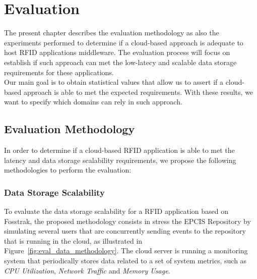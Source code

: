 
\chapter{Evaluation}
\label{chapter:evaluation}
The present chapter describes the evaluation methodology as also the experiments performed to determine
if a cloud-based approach is adequate to host \gls{RFID} applications middleware. The evaluation process
will focus on establish if such approach can met the low-latecy and scalable data storage requirements
for these applications.\\

Our main goal is to obtain statistical values that allow us to assert if a cloud-based approach is able
to met the expected requirements. With these results, we want to specify which domains can rely in such
approach.

\section{Evaluation Methodology}
\label{sec:eval_methodology}
In order to determine if a cloud-based \gls{RFID} application is able to met the latency and data
storage scalability requirements, we propose the following methodologies to perform the evaluation:

\subsection{Data Storage Scalability}
\label{sub:eval_methodology_data}
To evaluate the data storage scalability for a \gls{RFID} application based on Fosstrak, the proposed
methodology consists in stress the \gls{EPCIS} Repository by simulating several users that are
concurrently sending events to the repository that is running in the cloud, as illustrated in Figure~\ref{fig:eval_data_methodology}.
The cloud server is running a monitoring system that periodically stores data related to a set of
system metrics, such as \textit{CPU Utilization}, \textit{Network Traffic} and \textit{Memory Usage}.\\

